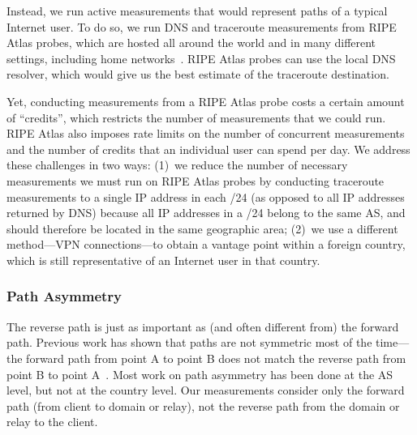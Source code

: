 Instead, we run active measurements that
would represent paths of a typical Internet user. To do so, we run
DNS and traceroute measurements from RIPE Atlas probes, which are hosted
all around the world and in many different settings, including home
networks~\cite{ripe_atlas}.  RIPE Atlas probes can use the local DNS
resolver, which would give us the best estimate of the traceroute
destination.

Yet, conducting measurements from a RIPE Atlas probe costs a certain
amount of ``credits'', which restricts the number of measurements that we
could run.  RIPE Atlas also imposes rate limits on the number of
concurrent measurements and the number of credits that an individual
user can spend per day.  We address these challenges in two ways: (1)~we
reduce the number of necessary measurements we must run on RIPE Atlas
probes by conducting traceroute measurements to a single IP address in
each /24 (as opposed to all IP addresses returned by DNS) because all IP
addresses in a /24 belong to the same AS, and should therefore be
located in the same geographic area; (2)~we use a different method---VPN
connections---to obtain a vantage point within a foreign country, which
is still representative of an Internet user in that country.

\subsubsection{Path Asymmetry}
\label{path_sym}

The reverse path is just as important as (and often different from) the 
forward path.  
Previous work has shown that paths are not symmetric most of the
time---the forward path from point A to point B does not match the
reverse path from point B to point A~\cite{he2005routing}.  Most work on
path asymmetry has been done at the AS level, but not at the country
level.  Our measurements consider only the forward path (from client
to domain or relay), not the reverse path from the domain or
relay to the client.   


